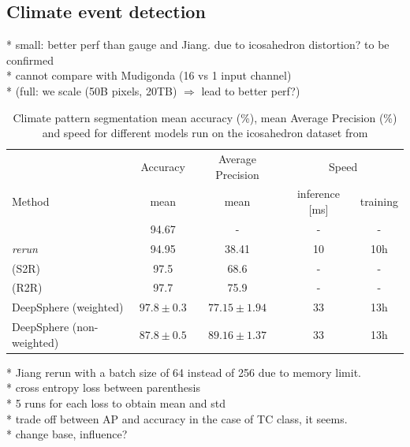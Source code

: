 \documentclass{article} %
\begin{document}
\subsection{Climate event detection}

* small: better perf than gauge and Jiang. due to icosahedron distortion? to be confirmed\\
* cannot compare with Mudigonda (16 vs 1 input channel)\\
* (full: we scale (50B pixels, 20TB) $\Rightarrow$ lead to better perf?) \\

\begin{table}
	\begin{tabular}{l|c c c c}
	\multicolumn{1}{l}{} & Accuracy & Average Precision & \multicolumn{2}{c}{Speed}\\
	\cmidrule(lr){2-2} \cmidrule(lr){3-3} \cmidrule(lr){4-5}
	\multicolumn{1}{l}{Method} & mean & mean & inference [ms] & training \\ \hline
	\cite{jiang_spherical_2019} & 94.67 & - & - & -\\
	\cite{jiang_spherical_2019} \emph{rerun} & 94.95 & 38.41 & 10 & 10h\\
	\cite{cohen_gauge_2019} (S2R) & 97.5 & 68.6 & - & -\\
	\cite{cohen_gauge_2019} (R2R) & 97.7 & 75.9 & - & -\\ \hline
	DeepSphere (weighted) & $97.8\pm 0.3$ & $77.15\pm 1.94$ & 33 & 13h \\
	DeepSphere (non-weighted) & $87.8\pm 0.5$ & $89.16\pm 1.37$ & 33 & 13h\\
	\end{tabular}
	\caption{Climate pattern segmentation mean accuracy (\%), mean Average Precision (\%) and speed for different models run on the icosahedron dataset from \cite{jiang_spherical_2019}}
\end{table}

* Jiang rerun with a batch size of 64 instead of 256 due to memory limit.\\
* cross entropy loss between parenthesis\\
* 5 runs for each loss to obtain mean and std\\

* trade off between AP and accuracy in the case of TC class, it seems.\\
* change base, influence?\\
\end{document}
